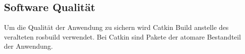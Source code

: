 
\subsection{Software Qualität}
Um die Qualität der Anwendung zu sichern wird Catkin Build anstelle des veralteten rosbuild verwendet. Bei Catkin sind Pakete der atomare Bestandteil der Anwendung.

